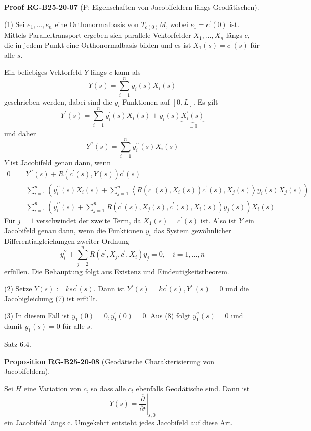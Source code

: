 \documentclass[10pt, letterpaper]{article}
\newcommand{\CustomHeading}[3]{%
  \par\medskip\noindent%
  \textbf{#1 #2} \textnormal{(#3)}.\enskip%
}
\newenvironment{PROP}[2]{\begin{unitbox}\CustomHeading{Proposition}{#1}{#2}}{\end{unitbox}}
\newenvironment{PROOF}[2]{\begin{unitbox}\CustomHeading{Proof}{#1}{#2}}{\end{unitbox}}
\begin{document}
\begin{PROOF}{RG-B25-20-07}{P: Eigenschaften von Jacobifeldern längs Geodätischen}
(1) Sei $e_{1}, \ldots, e_{n}$ eine Orthonormalbasis von $T_{c(0)} M$, wobei $e_{1}=c^{\prime}(0)$ ist. Mittels Paralleltransport ergeben sich parallele Vektorfelder $X_{1}, \ldots, X_{n}$ längs $c$, die in jedem Punkt eine Orthonormalbasis bilden und es ist $X_{1}(s)=c^{\prime}(s)$ für alle $s$.

Ein beliebiges Vektorfeld $Y$ längs $c$ kann als
$$
Y(s)=\sum_{i=1}^{n} y_{i}(s) X_{i}(s)
$$
geschrieben werden, dabei sind die $y_{i}$ Funktionen auf $[0, L]$.
Es gilt
$$
Y^{\prime}(s)=\sum_{i=1}^{n} y_{i}^{\prime}(s) X_{i}(s)+y_{i}(s) \underbrace{X_{i}^{\prime}(s)}_{=0}
$$
und daher
$$
Y^{\prime \prime}(s)=\sum_{i=1}^{n} y_{i}^{\prime \prime}(s) X_{i}(s)
$$
$Y$ ist Jacobifeld genau dann, wenn
$$
\begin{aligned}
0 & =Y^{\prime \prime}(s)+R\left(c^{\prime}(s), Y(s)\right) c^{\prime}(s) \\
& =\sum_{i=1}^{n}\left(y_{i}^{\prime \prime}(s) X_{i}(s)+\sum_{j=1}^{n}\left\langle R\left(c^{\prime}(s), X_{i}(s)\right) c^{\prime}(s), X_{j}(s)\right\rangle y_{i}(s) X_{j}(s)\right) \\
& =\sum_{i=1}^{n}\left(y_{i}^{\prime \prime}(s)+\sum_{j=1}^{n} R\left(c^{\prime}(s), X_{j}(s), c^{\prime}(s), X_{i}(s)\right) y_{j}(s)\right) X_{i}(s)
\end{aligned}
$$
Für $j=1$ verschwindet der zweite Term, da $X_{1}(s)=c^{\prime}(s)$ ist. Also ist $Y$ ein Jacobifeld genau dann, wenn die Funktionen $y_{i}$ das System gewöhnlicher Differentialgleichungen zweiter Ordnung
\begin{equation*}
y_{i}^{\prime \prime}+\sum_{j=2}^{n} R\left(c^{\prime}, X_{j}, c^{\prime}, X_{i}\right) y_{j}=0, \quad i=1, \ldots, n \tag{8}
\end{equation*}
erfüllen. Die Behauptung folgt aus Existenz und Eindeutigkeitstheorem.


(2) Setze $Y(s):=k s c^{\prime}(s)$. Dann ist $Y^{\prime}(s)=k c^{\prime}(s), Y^{\prime \prime}(s)=0$ und die Jacobigleichung (7) ist erfüllt.

(3) In diesem Fall ist $y_{1}(0)=0, y_{1}^{\prime}(0)=0$. Aus (8) folgt $y_{1}^{\prime \prime}(s)=0$ und damit $y_{1}(s)=0$ für alle $s$.
\end{PROOF}




Satz 6.4. 

\begin{PROP}{RG-B25-20-08}{Geodätische Charakterisierung von Jacobifeldern}
Sei $H$ eine Variation von $c$, so dass alle $c_{t}$ ebenfalls Geodätische sind. Dann ist 
$$Y(s)=\left.\overline{\frac{\partial}{\partial t}}\right|_{s, 0}$$ 
ein Jacobifeld längs c. Umgekehrt entsteht jedes Jacobifeld auf diese Art.
\end{PROP}
\end{document}
